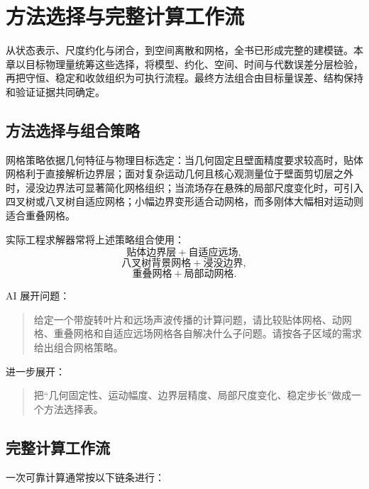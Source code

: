 \chapter{方法选择与完整计算工作流}\label{ch:22}
\begin{chaptersummary}
从状态表示、尺度约化与闭合，到空间离散和网格，全书已形成完整的建模链。本章以目标物理量统筹这些选择，将模型、约化、空间、时间与代数误差分层检验，再把守恒、稳定和收敛组织为可执行流程。最终方法组合由目标量误差、结构保持和验证证据共同确定。
\end{chaptersummary}
\section{方法选择与组合策略}
网格策略依据几何特征与物理目标选定：当几何固定且壁面精度要求较高时，贴体网格利于直接解析边界层；面对复杂运动几何且核心观测量位于壁面剪切层之外时，浸没边界法可显著简化网格组织；当流场存在悬殊的局部尺度变化时，可引入四叉树或八叉树自适应网格；小幅边界变形适合动网格，而多刚体大幅相对运动则适合重叠网格。

实际工程求解器常将上述策略组合使用：
\[
\text{贴体边界层}
+
\text{自适应远场},
\]
\[
\text{八叉树背景网格}
+
\text{浸没边界},
\]
\[
\text{重叠网格}
+
\text{局部动网格}.
\]

\begin{askai}
AI 展开问题：
\begin{quote}
给定一个带旋转叶片和远场声波传播的计算问题，请比较贴体网格、动网格、重叠网格和自适应远场网格各自解决什么子问题。请按各子区域的需求给出组合网格策略。
\end{quote}

进一步展开：
\begin{quote}
把“几何固定性、运动幅度、边界层精度、局部尺度变化、稳定步长”做成一个方法选择表。
\end{quote}
\end{askai}
\section{完整计算工作流}
一次可靠计算通常按以下链条进行：

